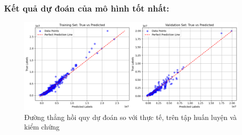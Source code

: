 \subsubsection{Kết quả dự đoán của mô hình tốt nhất:}

\begin{figure}[H]
    \centering
    \includegraphics[width=1\linewidth]{img_multiple/output_final.png}
    \caption{Đường thẳng hồi quy dự đoán so với thực tế, trên tập huấn luyện và kiểm chứng}
    \label{fig:enter-label}
\end{figure}

\pagebreak